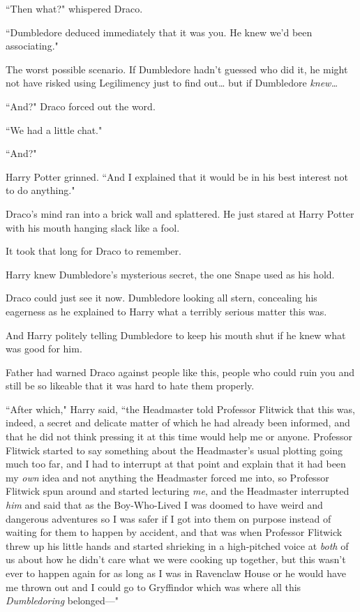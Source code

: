 ``Then what?" whispered Draco.

``Dumbledore deduced immediately that it was you. He knew we'd been associating."

The worst possible scenario. If Dumbledore hadn't guessed who did it, he might not have risked using Legilimency just to find out{\ldots} but if Dumbledore \emph{knew{\ldots}}

``And?" Draco forced out the word.

``We had a little chat."

``And?"

Harry Potter grinned. ``And I explained that it would be in his best interest not to do anything."

Draco's mind ran into a brick wall and splattered. He just stared at Harry Potter with his mouth hanging slack like a fool.

It took that long for Draco to remember.

Harry knew Dumbledore's mysterious secret, the one Snape used as his hold.

Draco could just see it now. Dumbledore looking all stern, concealing his eagerness as he explained to Harry what a terribly serious matter this was.

And Harry politely telling Dumbledore to keep his mouth shut if he knew what was good for him.

Father had warned Draco against people like this, people who could ruin you and still be so likeable that it was hard to hate them properly.

``After which," Harry said, ``the Headmaster told Professor Flitwick that this was, indeed, a secret and delicate matter of which he had already been informed, and that he did not think pressing it at this time would help me or anyone. Professor Flitwick started to say something about the Headmaster's usual plotting going much too far, and I had to interrupt at that point and explain that it had been my \emph{own} idea and not anything the Headmaster forced me into, so Professor Flitwick spun around and started lecturing \emph{me}, and the Headmaster interrupted \emph{him} and said that as the Boy-Who-Lived I was doomed to have weird and dangerous adventures so I was safer if I got into them on purpose instead of waiting for them to happen by accident, and that was when Professor Flitwick threw up his little hands and started shrieking in a high-pitched voice at \emph{both} of us about how he didn't care what we were cooking up together, but this wasn't ever to happen again for as long as I was in Ravenclaw House or he would have me thrown out and I could go to Gryffindor which was where all this \emph{Dumbledoring} belonged—"

